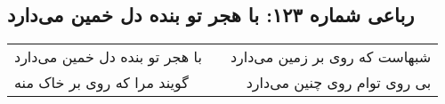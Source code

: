 \begin{center}
\section*{رباعی شماره ۱۲۳: با هجر تو بنده دل خمین می‌دارد}
\label{sec:sh123}
\begin{longtable}{l p{0.5cm} r}
با هجر تو بنده دل خمین می‌دارد
&&
شبهاست که روی بر زمین می‌دارد
\\
گویند مرا که روی بر خاک منه
&&
بی روی توام روی چنین می‌دارد
\\
\end{longtable}
\end{center}
